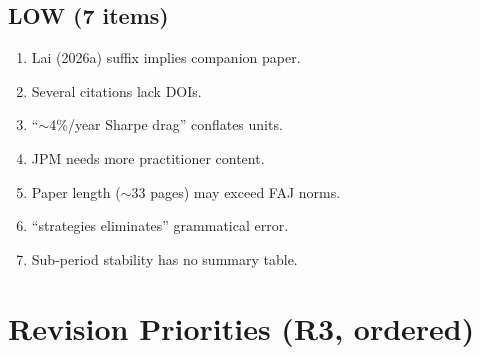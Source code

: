 \documentclass[12pt,a4paper]{article}
\begin{document}
\subsection*{\textcolor{lowsev}{LOW (7 items)}}

\begin{enumerate}[label=\textcolor{lowsev}{\textbf{L\arabic*}}]
\item Lai (2026a) suffix implies companion paper.
\item Several citations lack DOIs.
\item ``$\sim$4\%/year Sharpe drag'' conflates units.
\item JPM needs more practitioner content.
\item Paper length ($\sim$33 pages) may exceed FAJ norms.
\item ``strategies eliminates'' grammatical error.
\item Sub-period stability has no summary table.
\end{enumerate}


\section{Revision Priorities (R3, ordered)}
\label{sec:priorities}
\end{document}
